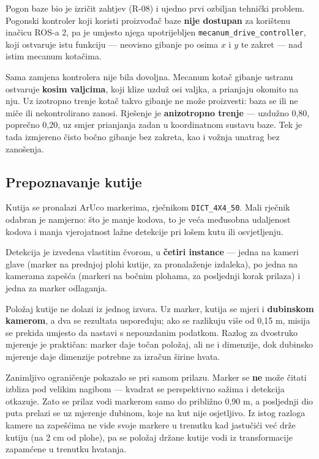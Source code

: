 \documentclass[12pt,a4paper]{article}
\begin{document}
Pogon baze bio je izričit zahtjev (R-08) i ujedno prvi ozbiljan tehnički problem. Pogonski
kontroler koji koristi proizvođač baze \textbf{nije dostupan} za korištenu inačicu ROS-a 2, pa je
umjesto njega upotrijebljen \texttt{mecanum\_drive\_controller}, koji ostvaruje istu funkciju ---
neovisno gibanje po osima $x$ i $y$ te zakret --- nad istim mecanum kotačima.

Sama zamjena kontrolera nije bila dovoljna. Mecanum kotač gibanje ustranu ostvaruje \textbf{kosim
valjcima}, koji klize uzduž osi valjka, a prianjaju okomito na nju. Uz izotropno trenje kotač
takvo gibanje ne može proizvesti: baza se ili ne miče ili nekontrolirano zanosi. Rješenje je
\textbf{anizotropno trenje} --- uzdužno 0,80, poprečno 0,20, uz smjer prianjanja zadan u
koordinatnom sustavu baze. Tek je tada izmjereno čisto bočno gibanje bez zakreta, kao i vožnja
unatrag bez zanošenja.

\subsection{Prepoznavanje kutije}

Kutija se pronalazi ArUco markerima, rječnikom \texttt{DICT\_4X4\_50}. Mali rječnik odabran je
namjerno: što je manje kodova, to je veća međusobna udaljenost kodova i manja vjerojatnost lažne
detekcije pri lošem kutu ili osvjetljenju.

Detekcija je izvedena vlastitim čvorom, u \textbf{četiri instance} --- jedna na kameri glave
(marker na prednjoj plohi kutije, za pronalaženje izdaleka), po jedna na kamerama zapešća
(markeri na bočnim plohama, za posljednji korak prilaza) i jedna za marker odlaganja.

Položaj kutije ne dolazi iz jednog izvora. Uz marker, kutija se mjeri i \textbf{dubinskom
kamerom}, a dva se rezultata uspoređuju; ako se razlikuju više od 0,15 m, misija se prekida
umjesto da nastavi s nepouzdanim podatkom. Razlog za dvostruko mjerenje je praktičan: marker daje
točan položaj, ali ne i dimenzije, dok dubinsko mjerenje daje dimenzije potrebne za izračun
širine hvata.

Zanimljivo ograničenje pokazalo se pri samom prilazu. Marker se \textbf{ne} može čitati izbliza
pod velikim nagibom --- kvadrat se perspektivno sažima i detekcija otkazuje. Zato se prilaz vodi
markerom samo do približno 0,90 m, a posljednji dio puta prelazi se uz mjerenje dubinom, koje na
kut nije osjetljivo. Iz istog razloga kamere na zapešćima ne vide svoje markere u trenutku kad
jastučići već drže kutiju (na 2 cm od plohe), pa se položaj držane kutije vodi iz transformacije
zapamćene u trenutku hvatanja.
\end{document}
